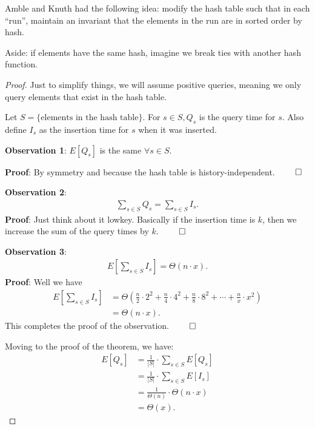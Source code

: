 \documentclass{report}
\begin{document}
\noindent Amble and Knuth had the following idea:
modify the hash table such that in each ``run'', maintain an invariant that the elements in the run are in sorted order by hash.

\noindent Aside: if elements have the same hash, imagine we break ties with another hash function. 
\begin{proof}
    Just to simplify things, we will assume positive queries, meaning we only query elements that exist in the hash table.  

    Let $S = \{\text{elements in the hash table}\}$. For $s \in S, Q_s$ is the query time for $s$. Also define $I_s$ as the insertion time for $s$ when it was inserted.

    \noindent \textbf{Observation 1}: $E[Q_s]$ is the same $\forall s\in S$.
    
    \noindent \textbf{Proof}: By symmetry and because the hash table is history-independent. $\hfill \qed$

    \noindent \textbf{Observation 2}: 
    \begin{align*}
        \sum_{s\in S} Q_s = \sum_{s \in S} I_s.
    \end{align*}
    \noindent \textbf{Proof}: Just think about it lowkey. Basically if the insertion time is $k$, then we increase the sum of the query times by $k$.  $\hfill \qed$

    \noindent \textbf{Observation 3}: 
    \begin{align*}
        E\left[ \sum_{s \in S} I_s \right] = \Theta(n \cdot x).
    \end{align*}
    \noindent \textbf{Proof}: Well we have 
    \begin{align*}
        E\left[ \sum_{s \in S} I_s \right] &= \Theta \left( \frac n2 \cdot 2^2 + \frac n4 \cdot 4^2 + \frac n8 \cdot 8^2 + \cdots + \frac{n}{x} \cdot x^2\right) \\
        &= \Theta\left( n\cdot x\right). \tag{dominated by last summand}
    \end{align*}
    This completes the proof of the observation. $\hfill \qed$

    \noindent Moving to the proof of the theorem, we have:
    \begin{align*}
        E[Q_s] &= \frac{1}{|S|} \cdot \sum_{s \in S} E[Q_s] \\
        &= \frac{1}{|S|} \cdot \sum_{s \in S} E[I_s] \\
        &= \frac{1}{\Theta(n)} \cdot \Theta(n \cdot x) \\
        &= \Theta(x).
    \end{align*}
\end{proof}
\end{document}
